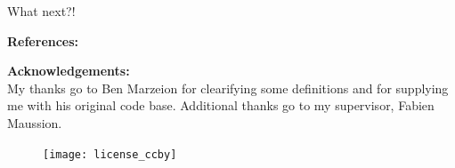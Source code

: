 \documentclass[final]{beamer}
\begin{document}
\begin{frame}[fragile]
\begin{columns}[t]
\begin{rightcolumn}
\begin{boxblock}{What next?!}
   \end{boxblock}

   \begin{footnotesize}

   \textbf{References:} \\
   
   
   
   \vspace{0.3cm}
   \begin{minipage}[t]{0.75\textwidth}
      \textbf{Acknowledgements:} \\
      My thanks go to Ben Marzeion for clearifying some definitions and for supplying me with his original code base. Additional thanks go to my supervisor, Fabien Maussion.
   \end{minipage}
   \hfill
   \begin{minipage}[t]{0.12\textwidth}
      \begin{figure}
         \texttt{[image: license\_ccby]}
      \end{figure}
   \end{minipage}
   \end{footnotesize}
\end{rightcolumn}

\end{columns}
\end{frame}
\end{document}
